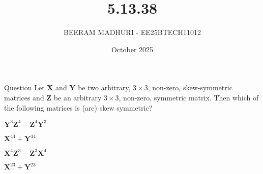 \documentclass{beamer}
\title %
{5.13.38}
\date{October  2025}
\author %
{BEERAM MADHURI - EE25BTECH11012}
\begin{document}
\frame{\titlepage}
\begin{frame}{Question}
Let $\mathbf{X}$ and $\mathbf{Y}$ be two arbitrary, $3 \times 3$, non-zero, skew-symmetric matrices and $\mathbf{Z}$ be an arbitrary $3 \times 3$, non-zero, symmetric matrix. Then which of the following matrices is (are) skew symmetric?

\begin{enumerate}
\begin{multicols}{4}
    \item $\mathbf{Y}^3 \mathbf{Z}^4 - \mathbf{Z}^4 \mathbf{Y}^3$
    \item $\mathbf{X}^{44} + \mathbf{Y}^{44}$
    \item $\mathbf{X}^4 \mathbf{Z}^3 - \mathbf{Z}^3 \mathbf{X}^4$
    \item $\mathbf{X}^{23} + \mathbf{Y}^{23}$
\end{multicols}
\end{enumerate}

\end{frame}
 
\end{document}
